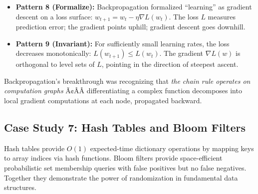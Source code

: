 \begin{itemize}
\item \textbf{Pattern 8 (Formalize):} Backpropagation formalized ``learning'' as gradient descent on a loss surface: $w_{t+1} = w_t - \eta \nabla L(w_t)$. The loss $L$ measures prediction error; the gradient points uphill; gradient descent goes downhill.

\item \textbf{Pattern 9 (Invariant):} For sufficiently small learning rates, the loss decreases monotonically: $L(w_{t+1}) \le L(w_t)$. The gradient $\nabla L(w)$ is orthogonal to level sets of $L$, pointing in the direction of steepest ascent.
\end{itemize}

\begin{mentalLeap}Backpropagation's breakthrough was recognizing that \emph{the chain rule operates on computation graphs} Ã¢ÂÂ differentiating a complex function decomposes into local gradient computations at each node, propagated backward.\end{mentalLeap}

\subsection{Case Study 7: Hash Tables and Bloom Filters}

Hash tables provide $O(1)$ expected-time dictionary operations by mapping keys to array indices via hash functions. Bloom filters provide space-efficient probabilistic set membership queries with false positives but no false negatives. Together they demonstrate the power of randomization in fundamental data structures.

